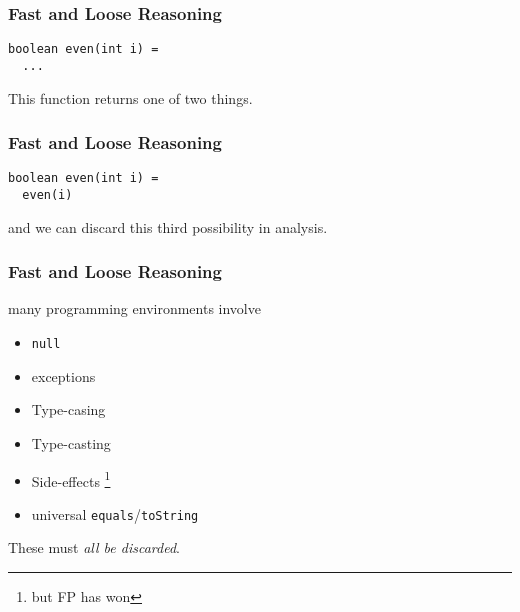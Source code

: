 \begin{frame}[fragile]
\frametitle{Fast and Loose Reasoning}
\begin{lstlisting}
boolean even(int i) =
  ...
\end{lstlisting}
This function returns one of two things.
\end{frame}

\begin{frame}[fragile]
\frametitle{Fast and Loose Reasoning}
\begin{lstlisting}
boolean even(int i) =
  even(i)
\end{lstlisting}
and we can discard this third possibility in analysis.
\end{frame}

\begin{frame}[fragile]
\frametitle{Fast and Loose Reasoning}
\begin{block}{many programming environments involve}
\begin{itemize}
  \item \lstinline{null}
  \item exceptions
  \item Type-casing
  \item Type-casting
  \item Side-effects \footnote{but FP has won}
  \item universal \lstinline{equals}/\lstinline{toString}
\end{itemize}
\end{block}
These must \emph{all be discarded}.
\end{frame}

